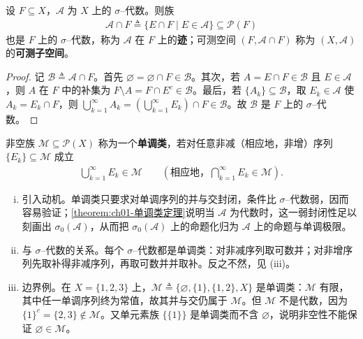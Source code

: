 \documentclass[../../main.tex]{subfiles}%
\begin{document}
\begin{remark}\label{remark:ch01-迹}
设 $F\subseteq X$，$\mathcal{A}$ 为 $X$ 上的 $\sigma$--代数。则族
\begin{align*}
\mathcal{A}\cap F\triangleq\{E\cap F\mid E\in\mathcal{A}\}\subseteq\mathcal{P}(F)
\end{align*}
也是 $F$ 上的 $\sigma$--代数，称为 $\mathcal{A}$ 在 $F$ 上的\textbf{迹}；可测空间 $(F,\mathcal{A}\cap F)$ 称为 $(X,\mathcal{A})$ 的\textbf{可测子空间}。
\end{remark}

\begin{proof}
记 $\mathcal{B}\triangleq\mathcal{A}\cap F$。首先 $\varnothing=\varnothing\cap F\in\mathcal{B}$。其次，若 $A=E\cap F\in\mathcal{B}$ 且 $E\in\mathcal{A}$，则 $A$ 在 $F$ 中的补集为 $F\setminus A=F\cap E^c\in\mathcal{B}$。最后，若 $\{A_k\}\subseteq\mathcal{B}$，取 $E_k\in\mathcal{A}$ 使 $A_k=E_k\cap F$，则 $\bigcup_{k=1}^\infty A_k=(\bigcup_{k=1}^\infty E_k)\cap F\in\mathcal{B}$。故 $\mathcal{B}$ 是 $F$ 上的 $\sigma$--代数。
\end{proof}

\begin{definition}\label{definition:ch01-单调类}
非空族 $\mathcal{M}\subseteq\mathcal{P}(X)$ 称为一个\textbf{单调类}，若对任意非减（相应地，非增）序列 $\{E_k\}\subseteq\mathcal{M}$ 成立
\begin{align*}
\bigcup_{k=1}^\infty E_k\in\mathcal{M}\qquad(\text{相应地，}\bigcap_{k=1}^\infty E_k\in\mathcal{M}).
\end{align*}
\end{definition}

\begin{remark}\label{remark:ch01-单调类}
\begin{enumerate}[(i)]
\item 引入动机。单调类只要求对单调序列的并与交封闭，条件比 $\sigma$--代数弱，因而容易验证；\cref{theorem:ch01-单调类定理}说明当 $\mathcal{A}$ 为代数时，这一弱封闭性足以刻画出 $\sigma_0(\mathcal{A})$，从而把 $\sigma_0(\mathcal{A})$ 上的命题化归为 $\mathcal{A}$ 上的命题与单调极限。
\item 与 $\sigma$--代数的关系。每个 $\sigma$--代数都是单调类：对非减序列取可数并；对非增序列先取补得非减序列，再取可数并并取补。反之不然，见 (iii)。
\item 边界例。在 $X=\{1,2,3\}$ 上，$\mathcal{M}\triangleq\{\varnothing,\{1\},\{1,2\},X\}$ 是单调类：$\mathcal{M}$ 有限，其中任一单调序列终为常值，故其并与交仍属于 $\mathcal{M}$。但 $\mathcal{M}$ 不是代数，因为 $\{1\}^c=\{2,3\}\notin\mathcal{M}$。又单元素族 $\{\{1\}\}$ 是单调类而不含 $\varnothing$，说明非空性不能保证 $\varnothing\in\mathcal{M}$。
\end{enumerate}
\end{remark}
\end{document}
